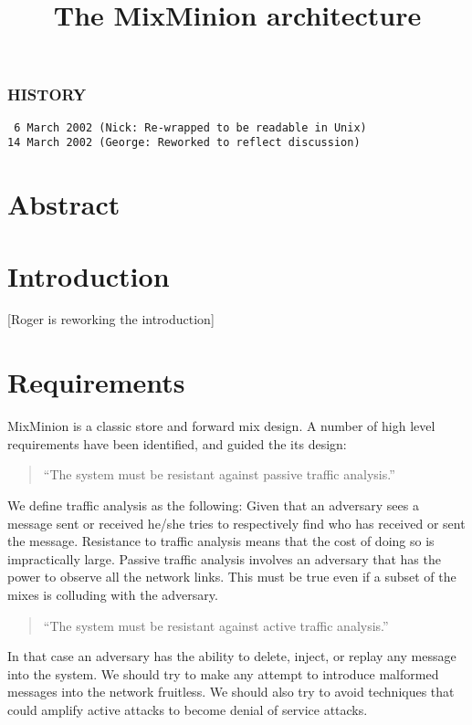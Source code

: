 \documentclass{article}
\begin{document}
\title{The MixMinion architecture}
\maketitle

\subsubsection{HISTORY}
\begin{verbatim}
 6 March 2002 (Nick: Re-wrapped to be readable in Unix)
14 March 2002 (George: Reworked to reflect discussion)
\end{verbatim}

\section{Abstract}
\section{Introduction}

[Roger is reworking the introduction]

\section{Requirements}

MixMinion is a classic store and forward mix design. A number of high
level requirements have been identified, and guided the its design:

\begin{quote}
     ``The system must be resistant against passive traffic analysis.''
\end{quote}

We define traffic analysis as the following: Given that an adversary
sees a message sent or received he/she tries to respectively find who
has received or sent the message. Resistance to traffic analysis means
that the cost of doing so is impractically large. Passive traffic
analysis involves an adversary that has the power to observe all the
network links. This must be true even if a subset of the mixes is
colluding with the adversary.

\begin{quote}
     ``The system must be resistant against active traffic analysis.''
\end{quote}

In that case an adversary has the ability to delete, inject, or replay 
any message into the system. We should try to make any attempt to
introduce malformed messages into the network fruitless. We should
also try to avoid techniques that could amplify active attacks to
become denial of service attacks.
\end{document}
